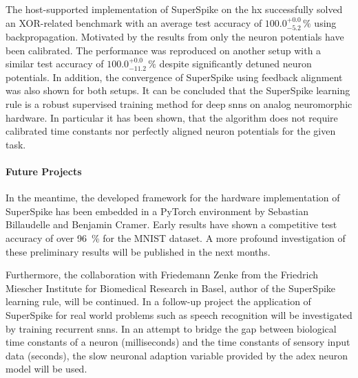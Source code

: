 The host-supported implementation of SuperSpike on the \gls{hx} successfully solved an XOR-related benchmark with an average test accuracy of $100.0_{-5.2}^{+0.0}\, \%$ using backpropagation. Motivated by the results from \cite{wunderlich2019advantages} only the neuron potentials have been calibrated. The performance was reproduced on another setup with a similar test accuracy of $100.0_{-11.2}^{+0.0}\, \%$ despite significantly detuned neuron potentials. In addition, the convergence of SuperSpike using feedback alignment was also shown for both setups. It can be concluded that the SuperSpike learning rule is a robust supervised training method for deep \glspl{snn} on analog neuromorphic hardware. In particular it has been shown, that the algorithm does not require calibrated time constants nor perfectly aligned neuron potentials for the given task.
\vspace{-0.2cm}
\paragraph{Future Projects} In the meantime, the developed framework for the hardware implementation of SuperSpike has been embedded in a PyTorch environment by Sebastian Billaudelle and Benjamin Cramer. Early results have shown a competitive test accuracy of over \SI{96}{\%} for the MNIST dataset. A more profound investigation of these preliminary results will be published in the next months.

Furthermore, the collaboration with Friedemann Zenke from the Friedrich Miescher Institute for Biomedical Research in Basel, author of the SuperSpike learning rule, will be continued. In a follow-up project the application of SuperSpike for real world problems such as speech recognition will be investigated by training recurrent \glspl{snn}. In an attempt to bridge the gap between biological time constants of a neuron (milliseconds) and the time constants of sensory input data (seconds), the slow neuronal adaption variable provided by the \gls{adex} neuron model will be used.
\vspace{-0.9cm}